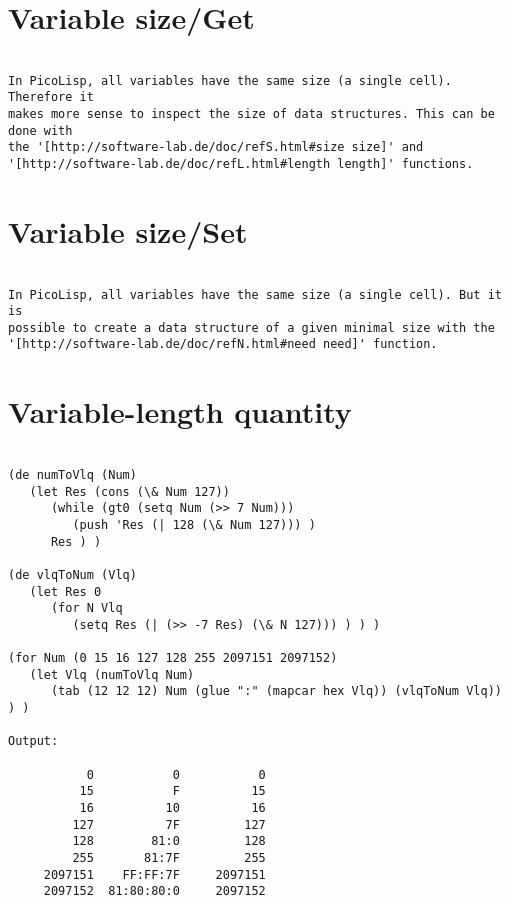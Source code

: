 \section*{Variable size/Get}

\begin{verbatim}

In PicoLisp, all variables have the same size (a single cell). Therefore it
makes more sense to inspect the size of data structures. This can be done with
the '[http://software-lab.de/doc/refS.html#size size]' and
'[http://software-lab.de/doc/refL.html#length length]' functions.

\end{verbatim}

\section*{Variable size/Set}

\begin{verbatim}

In PicoLisp, all variables have the same size (a single cell). But it is
possible to create a data structure of a given minimal size with the
'[http://software-lab.de/doc/refN.html#need need]' function.

\end{verbatim}

\section*{Variable-length quantity}

\begin{verbatim}

(de numToVlq (Num)
   (let Res (cons (\& Num 127))
      (while (gt0 (setq Num (>> 7 Num)))
         (push 'Res (| 128 (\& Num 127))) )
      Res ) )

(de vlqToNum (Vlq)
   (let Res 0
      (for N Vlq
         (setq Res (| (>> -7 Res) (\& N 127))) ) ) )

(for Num (0 15 16 127 128 255 2097151 2097152)
   (let Vlq (numToVlq Num)
      (tab (12 12 12) Num (glue ":" (mapcar hex Vlq)) (vlqToNum Vlq)) ) )

Output:

           0           0           0
          15           F          15
          16          10          16
         127          7F         127
         128        81:0         128
         255       81:7F         255
     2097151    FF:FF:7F     2097151
     2097152  81:80:80:0     2097152

\end{verbatim}

